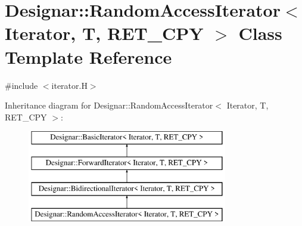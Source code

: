 \hypertarget{class_designar_1_1_random_access_iterator}{}\section{Designar\+:\+:Random\+Access\+Iterator$<$ Iterator, T, R\+E\+T\+\_\+\+C\+PY $>$ Class Template Reference}
\label{class_designar_1_1_random_access_iterator}


{\ttfamily \#include $<$iterator.\+H$>$}

Inheritance diagram for Designar\+:\+:Random\+Access\+Iterator$<$ Iterator, T, R\+E\+T\+\_\+\+C\+PY $>$\+:\begin{figure}[H]
\begin{center}
\leavevmode
\includegraphics[height=4.000000cm]{class_designar_1_1_random_access_iterator}
\end{center}
\end{figure}
